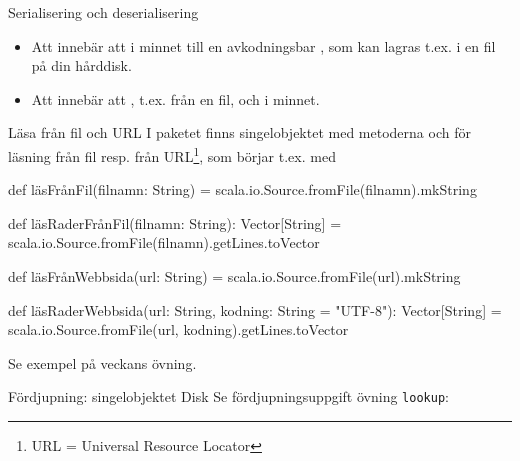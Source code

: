 


\begin{Slide}{Serialisering och deserialisering}
\begin{itemize}
  \item Att  innebär att  i minnet till en avkodningsbar , som kan lagras t.ex. i en fil på din hårddisk.
  \item Att  innebär att , t.ex. från en fil, och  i minnet.
\end{itemize}
\end{Slide}


\begin{Slide}{Läsa från fil och URL}
I paketet  finns singelobjektet  med metoderna  och  för läsning från fil resp. från  URL\footnote{URL = Universal Resource Locator}, som börjar t.ex. med 
\begin{Code}
def läsFrånFil(filnamn: String) = scala.io.Source.fromFile(filnamn).mkString

def läsRaderFrånFil(filnamn: String): Vector[String] =
  scala.io.Source.fromFile(filnamn).getLines.toVector

def läsFrånWebbsida(url: String) = scala.io.Source.fromFile(url).mkString

def läsRaderWebbsida(url: String, kodning: String = "UTF-8"): Vector[String] =
  scala.io.Source.fromFile(url, kodning).getLines.toVector

\end{Code}
Se exempel på veckans övning.
\end{Slide}


\begin{Slide}{Fördjupning: singelobjektet Disk}
Se fördjupningsuppgift övning \texttt{lookup}:
\end{Slide}
